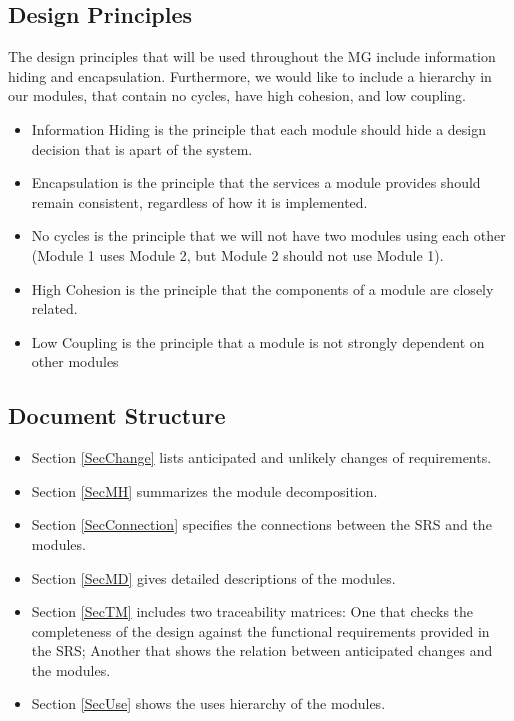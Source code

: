 \documentclass[12pt, titlepage]{article}
\begin{document}
\subsection{Design Principles}
The design principles that will be used throughout the MG include information hiding and encapsulation. Furthermore, we would like to include a hierarchy in our modules, that contain no cycles, have high cohesion, and low coupling. 
\begin{itemize}
    \item Information Hiding is the principle that each module should hide a design decision that is apart of the system.
    \item Encapsulation is the principle that the services a module provides should remain consistent, regardless of how it is implemented.
    \item No cycles is the principle that we will not have two modules using each other (Module 1 uses Module 2, but Module 2 should not use Module 1). 
    \item High Cohesion is the principle that the components of a module are closely related.
    \item Low Coupling is the principle that a module is not strongly dependent on other modules
\end{itemize}

\subsection{Document Structure}
\begin{itemize}
    \item Section \ref{SecChange} lists anticipated and unlikely changes of requirements.
    \item Section \ref{SecMH} summarizes the module decomposition.
    \item Section \ref{SecConnection} specifies the connections between the SRS and the modules. 
    \item Section \ref{SecMD} gives detailed descriptions of the modules.
    \item Section \ref{SecTM} includes two traceability matrices: One that checks the completeness of the design against the functional requirements provided in the SRS; Another that shows the relation between anticipated changes and the modules. 
    \item Section \ref{SecUse} shows the uses hierarchy of the modules. 
\end{itemize}
\end{document}
